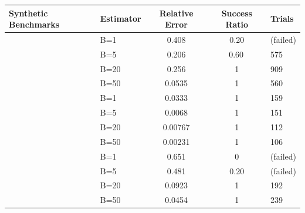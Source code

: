 
\begin{table}[t]
  \centering
  \tiny
  \begin{tabular}{@{} l l S[scientific-notation=true] S[table-format=1.2] l @{}}
    \toprule
    \textbf{Synthetic Benchmarks} & \textbf{Estimator} & \textbf{Relative Error} & \textbf{Success Ratio} & \textbf{Trials} \\
    \midrule
{} &   B=1 & \num{0.408} & \num{0.20} & (failed) \\
    & B=5      & \num{0.206} & {\num{0.60}\,}  & \num{575} \\
    &  B=20     & \num{0.256} & {1} & \num{909} \\
    &  B=50     & \num{0.0535} & {1} & \num{560} \\
    \midrule
{} &   B=1              & \num{0.0333} & {1}& \num{159} \\
    &  B=5             & \num{0.0068} & {1} & \num{151} \\
    &  B=20            & \num{0.00767} & {1} & \num{112} \\
    &  B=50            & \num{0.00231} & {1} & \num{106}  \\
    \midrule
{} &   B=1 & \num{0.651} & \num{0} & (failed) \\
    &  B=5      & \num{0.481} & \num{0.20} & (failed) \\
    &  B=20     & \num{0.0923} & {1} & \num{192} \\
    &  B=50     & \num{0.0454} & {1} & \num{239} \\
  

\end{tabular}
\end{table}
